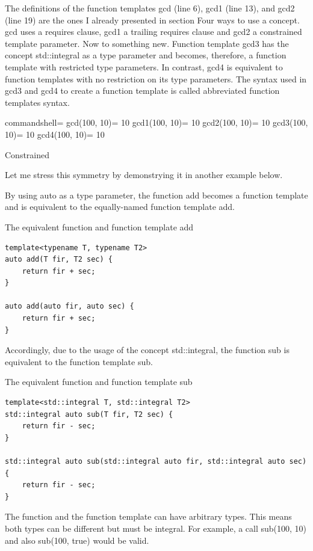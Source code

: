 The definitions of the function templates gcd (line 6), gcd1 (line 13), and gcd2 (line 19) are the ones I already presented in section Four ways to use a concept. gcd uses a requires clause, gcd1 a trailing requires clause and gcd2 a constrained template parameter. Now to something new. Function template gcd3 has the concept std::integral as a type parameter and becomes, therefore, a function template with restricted type parameters. In contrast, gcd4 is equivalent to function templates with no restriction on its type parameters. The syntax used in gcd3 and gcd4 to create a function template is called abbreviated function templates syntax.

\begin{tcblisting}{commandshell={}}
gcd(100, 10)= 10
gcd1(100, 10)= 10
gcd2(100, 10)= 10
gcd3(100, 10)= 10
gcd4(100, 10)= 10
\end{tcblisting}

\begin{center}
Constrained
\end{center}

Let me stress this symmetry by demonstrying it in another example below.

By using auto as a type parameter, the function add becomes a function template and is equivalent to the equally-named function template add.

\noindent
The equivalent function and function template add
\begin{lstlisting}[style=styleCXX]
template<typename T, typename T2>
auto add(T fir, T2 sec) {
	return fir + sec;
}

auto add(auto fir, auto sec) {
	return fir + sec;
}
\end{lstlisting}

Accordingly, due to the usage of the concept std::integral, the function sub is equivalent to the function template sub.

\noindent
The equivalent function and function template sub
\begin{lstlisting}[style=styleCXX]
template<std::integral T, std::integral T2>
std::integral auto sub(T fir, T2 sec) {
	return fir - sec;
}

std::integral auto sub(std::integral auto fir, std::integral auto sec) {
	return fir - sec;
}
\end{lstlisting}

The function and the function template can have arbitrary types. This means both types can be different but must be integral. For example, a call sub(100, 10) and also sub(100, true) would be valid.

